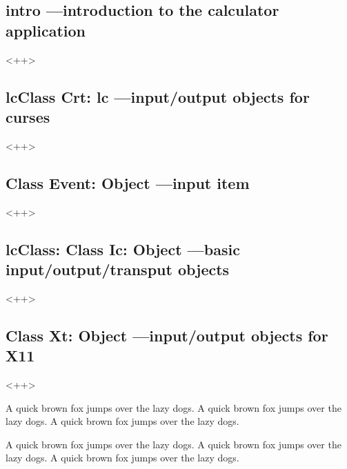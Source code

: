\subsection{intro ---introduction to the calculator application}
<++>

\subsection{lcClass Crt: lc ---input/output objects for curses}
<++>

\subsection{Class Event: Object ---input item}
<++>

\subsection{lcClass: Class Ic: Object ---basic input/output/transput objects}
<++>

\subsection{Class Xt: Object ---input/output objects for X11}
<++>

A quick brown fox jumps over the lazy dogs.
A quick brown fox jumps over the lazy dogs.
A quick brown fox jumps over the lazy dogs.

A quick brown fox jumps over the lazy dogs.
A quick brown fox jumps over the lazy dogs.
A quick brown fox jumps over the lazy dogs.


